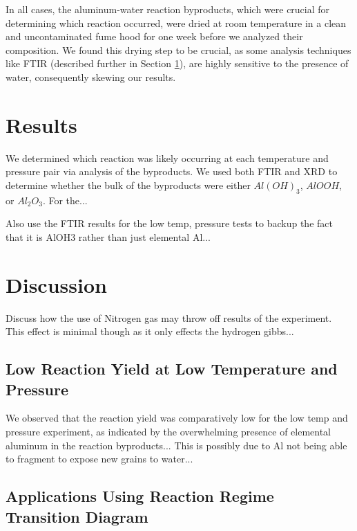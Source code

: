 \documentclass[preprint,12pt,3p]{elsarticle}
\begin{document}
In all cases, the aluminum-water reaction byproducts, which were crucial for
determining which reaction occurred, were dried at room temperature in a clean
and uncontaminated fume hood for one week before we analyzed their composition.
We found this drying step to be crucial, as some analysis techniques like FTIR
(described further in Section \ref{results}), are highly sensitive to the
presence of water, consequently skewing our results.

\section{Results}
\label{results}

We determined which reaction was likely occurring at each temperature and
pressure pair via analysis of the byproducts. We used both FTIR and XRD to
determine whether the bulk of the byproducts were either $Al(OH)_3$, $AlOOH$, or
$Al_2O_3$. For the...

Also use the FTIR results for the low temp, pressure tests to backup the fact
that it is AlOH3 rather than just elemental Al...

\section{Discussion}
\label{discussion}

Discuss how the use of Nitrogen gas may throw off results of the experiment.
This effect is minimal though as it only effects the hydrogen gibbs...

\subsection{Low Reaction Yield at Low Temperature and Pressure}

We observed that the reaction yield was comparatively low for the low temp and
pressure experiment, as indicated by the overwhelming presence of elemental
aluminum in the reaction byproducts... This is possibly due to Al not being able
to fragment to expose new grains to water...
 
\subsection{Applications Using Reaction Regime Transition Diagram}
\end{document}
